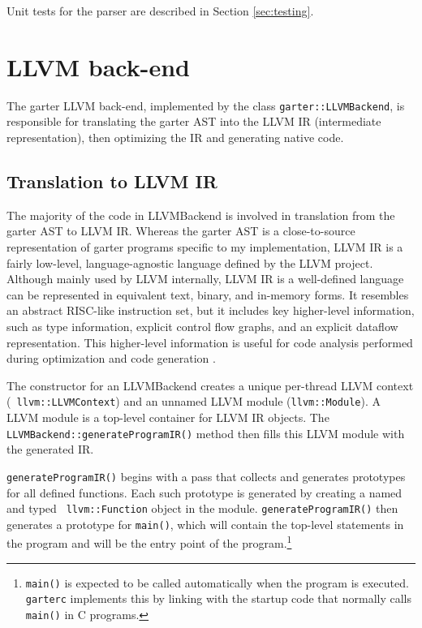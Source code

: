 \documentclass[11pt]{article}
\begin{document}
Unit tests for the parser are described in Section \ref{sec:testing}.

\section{LLVM back-end}

The garter LLVM back-end, implemented by the class {\tt garter::LLVMBackend}, is
responsible for translating the garter AST into the LLVM IR (intermediate
representation), then optimizing the IR and generating native code.

\subsection{Translation to LLVM IR}

The majority of the code in LLVMBackend is involved in translation from the
garter AST to LLVM IR.  Whereas the garter AST is a close-to-source
representation of garter programs specific to my implementation, LLVM IR is a
fairly low-level, language-agnostic language defined by the LLVM project.
Although mainly used by LLVM internally, LLVM IR is a well-defined language can
be represented in equivalent text, binary, and in-memory forms.  It resembles an
abstract RISC-like instruction set, but it includes key higher-level
information, such as type information, explicit control flow graphs, and an
explicit dataflow representation.  This higher-level information is useful for
code analysis performed during optimization and code generation
\cite{lattner2004llvm}.

The constructor for an LLVMBackend creates a unique per-thread LLVM context ({\tt
llvm::LLVMContext}) and an unnamed LLVM module ({\tt llvm::Module}).
A LLVM module is a top-level container for LLVM IR objects. The {\tt
LLVMBackend::generateProgramIR()} method
then fills this LLVM module with the generated IR.

{\tt generateProgramIR()} begins with a pass
that collects and generates prototypes for all defined functions.
Each such prototype is generated by creating a named and typed {\tt
llvm::Function} object in the module.  {\tt generateProgramIR()} then generates a
prototype for {\tt main()}, which will contain the top-level statements in the
program and will be the entry point of the program.\footnote{
    {\tt main()} is expected to be called automatically when the program is
    executed. {\tt garterc} implements this by linking with the startup code
that normally calls {\tt main()} in C programs.}
\end{document}
